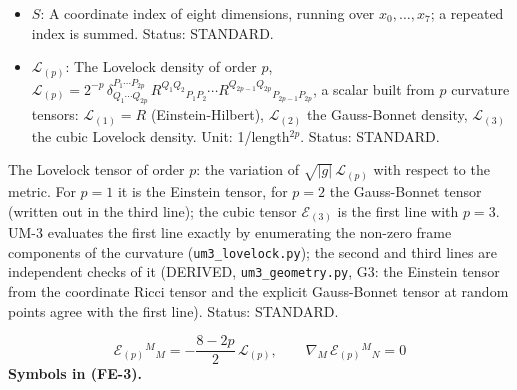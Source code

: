 \documentclass[
  10pt,
]{article}
\begin{document}
\begin{itemize}
  the convention in which the commutator of two covariant derivatives,
  acting on a vector, is the Riemann tensor, with its last two indices
  those of the two derivatives, contracted with the vector), with two
  indices the Ricci tensor \(R_{MN} = R^P{}_{MPN}\), without indices the
  scalar curvature \(R = g^{MN}R_{MN}\); with frame indices
  \(R^{(a)(b)}{}_{(c)(d)}\) its frame components,
  \(R^{(a)(b)}{}_{(a)(b)}\) (no sum) the sectional curvature of the
  frame plane \((a, b)\). Unit: 1/length\(^2\). Status: STANDARD.
\item
  \(S\): A coordinate index of eight dimensions, running over
  \(x_0, \dots, x_7\); a repeated index is summed. Status: STANDARD.
\item
  \(\mathcal{L}_{(p)}\): The Lovelock density of order \(p\),
  \(\mathcal{L}_{(p)} = 2^{-p}\,\delta^{P_1\cdots P_{2p}}_{Q_1\cdots Q_{2p}}\,R^{Q_1Q_2}{}_{P_1P_2}\cdots R^{Q_{2p-1}Q_{2p}}{}_{P_{2p-1}P_{2p}}\),
  a scalar built from \(p\) curvature tensors: \(\mathcal{L}_{(1)} = R\)
  (Einstein-Hilbert), \(\mathcal{L}_{(2)}\) the Gauss-Bonnet density,
  \(\mathcal{L}_{(3)}\) the cubic Lovelock density. Unit:
  1/length\(^{2p}\). Status: STANDARD.
\end{itemize}

The Lovelock tensor of order \(p\): the variation of
\(\sqrt{\lvert g\rvert}\,\mathcal{L}_{(p)}\) with respect to the metric.
For \(p = 1\) it is the Einstein tensor, for \(p = 2\) the Gauss-Bonnet
tensor (written out in the third line); the cubic tensor
\(\mathcal{E}_{(3)}\) is the first line with \(p = 3\). UM-3 evaluates
the first line exactly by enumerating the non-zero frame components of
the curvature (\texttt{um3\_lovelock.py}); the second and third lines
are independent checks of it (DERIVED, \texttt{um3\_geometry.py}, G3:
the Einstein tensor from the coordinate Ricci tensor and the explicit
Gauss-Bonnet tensor at random points agree with the first line). Status:
STANDARD.

\[
\mathcal{E}_{(p)}{}^M{}_M = -\frac{8 - 2p}{2}\,\mathcal{L}_{(p)},\qquad \nabla_M\,\mathcal{E}_{(p)}{}^M{}_N = 0 \tag{FE-3}
\] \textbf{Symbols in (FE-3).}
\end{document}
